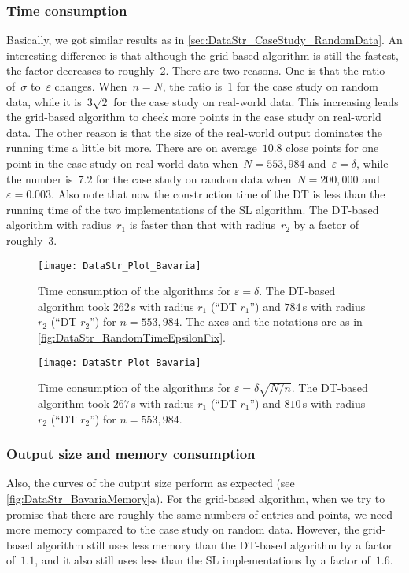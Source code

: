 \subsubsection{Time consumption}
Basically, we got similar results as in
\sect\ref{sec:DataStr_CaseStudy_RandomData}. 
An interesting difference is that 
although the grid-based algorithm is still the fastest, 
the factor decreases to roughly~$2$. 
There are two reasons. 
One is that the ratio of~$\sigma$ to~$\varepsilon$ changes. 
When~$n=N$, the ratio is~$1$ for the case study on random data,
while it is~$3\sqrt{2}$ for the case study 
on real-world data. 
This increasing leads the grid-based algorithm 
to check more points in the case study on real-world data. 
The other reason is that the size of the real-world output 
dominates the running time a little bit more. 
There are on average~$10.8$ close points 
for one point in the case study on real-world data 
when~$N=553{,}984$ and~$\varepsilon =\delta$, 
while the number is~$7.2$ for the case study on random data 
when~$N=200{,}000$ and~$\varepsilon=0.003$. 
Also note that now the construction time of the DT 
is less than the running time of 
the two implementations of the SL algorithm. 
The DT-based algorithm with radius~$r_{1}$ is faster than 
that with radius~$r_{2}$ by a factor of roughly~$3$.

\begin{figure}[tb]	
	\centering
	\texttt{[image: DataStr\_Plot\_Bavaria]}
	\caption{Time consumption of the algorithms for 
	$\varepsilon=\delta$. 
	The DT-based algorithm took  
	$262\,$s with radius $r_1$ (``DT $r_1$'') and  
	$784\,$s with radius $r_2$ (``DT $r_2$'') for 
	$n=553{,}984$. 
	The axes and the notations are as in 
	\fig\ref{fig:DataStr_RandomTimeEpsilonFix}.}
\label{fig:DataStr_BavariaTimeEpsilonFix}
	\par\vspace{\intextsep} %
	\centering
	\texttt{[image: DataStr\_Plot\_Bavaria]}
	\caption{Time consumption of the algorithms for 
	$\varepsilon=\delta\sqrt{N/n}$. 
	The DT-based algorithm took 
	$267\,$s with radius $r_1$ (``DT $r_1$'') and  
	$810\,$s with radius $r_2$ (``DT $r_2$'') for 
	$n=553{,}984$.}
\label{fig:DataStr_BavariaTimeEpsilonDecrease}
\end{figure}

\subsubsection{Output size and memory consumption}
Also, the curves of the output size perform as expected
(see \fig\ref{fig:DataStr_BavariaMemory}a). 
For the grid-based algorithm, when we try to 
promise that 
there are roughly the same numbers of entries and points, we 
need more 
memory compared to the case study on random data. However, the 
grid-based algorithm still uses less memory than the DT-based 
algorithm 
by a factor of~$1.1$, and it also still uses less than the SL 
implementations by a factor of~$1.6$.


